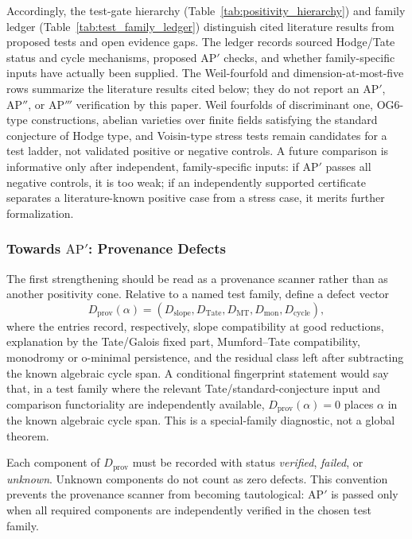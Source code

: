 \documentclass[aps,prd,twocolumn,superscriptaddress,nofootinbib]{revtex4-2}
\theoremstyle{definition}
\theoremstyle{remark}
\begin{document}
Accordingly, the test-gate hierarchy (Table~\ref{tab:positivity_hierarchy}) and family ledger (Table~\ref{tab:test_family_ledger}) distinguish cited literature results from proposed tests and open evidence gaps. The ledger records sourced Hodge/Tate status and cycle mechanisms, proposed $\mathrm{AP}'$ checks, and whether family-specific inputs have actually been supplied. The Weil-fourfold and dimension-at-most-five rows summarize the literature results cited below; they do not report an $\mathrm{AP}'$, $\mathrm{AP}''$, or $\mathrm{AP}'''$ verification by this paper. Weil fourfolds of discriminant one, OG6-type constructions, abelian varieties over finite fields satisfying the standard conjecture of Hodge type, and Voisin-type stress tests remain candidates for a test ladder, not validated positive or negative controls. A future comparison is informative only after independent, family-specific inputs: if $\mathrm{AP}'$ passes all negative controls, it is too weak; if an independently supported certificate separates a literature-known positive case from a stress case, it merits further formalization.

\subsubsection*{Towards \texorpdfstring{$\mathrm{AP}'$}{AP'}: Provenance Defects}
\label{subsec:provenance-defects}

The first strengthening should be read as a provenance scanner rather than
as another positivity cone. Relative to a named test family, define a defect
vector
\[
D_{\mathrm{prov}}(\alpha)
  = (D_{\mathrm{slope}},D_{\mathrm{Tate}},D_{\mathrm{MT}},
     D_{\mathrm{mon}},D_{\mathrm{cycle}}),
\]
where the entries record, respectively, slope compatibility at good
reductions, explanation by the Tate/Galois fixed part, Mumford--Tate
compatibility, monodromy or o-minimal persistence, and the residual class
left after subtracting the known algebraic cycle span.  A conditional
fingerprint statement would say that, in a test family where the relevant
Tate/standard-conjecture input and comparison functoriality are independently
available, $D_{\mathrm{prov}}(\alpha)=0$ places $\alpha$ in the known
algebraic cycle span.  This is a special-family diagnostic, not a global
theorem.

Each component of $D_{\mathrm{prov}}$ must be recorded with status
\emph{verified}, \emph{failed}, or \emph{unknown}.  Unknown components do not
count as zero defects.  This convention prevents the provenance scanner from
becoming tautological: $\mathrm{AP}'$ is passed only when all required
components are independently verified in the chosen test family.
\end{document}
